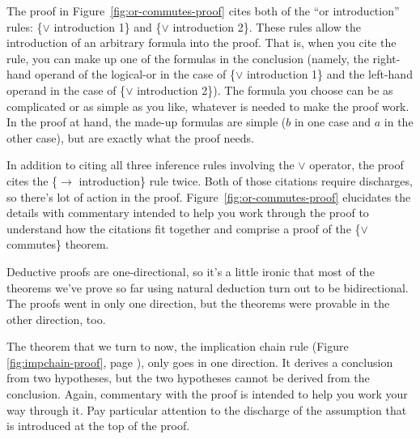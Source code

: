 {The proof in Figure~\ref{fig:or-commutes-proof} cites both of the
``or introduction'' rules:
\{$\vee$ introduction 1\} and \{$\vee$ introduction 2\}.
These rules allow the introduction of an arbitrary formula
into the proof.
That is, when you cite the rule, you can make up one of the
formulas in the conclusion (namely, the right-hand operand of
the logical-or in the case of \{$\vee$ introduction 1\}
and the left-hand operand in the case of \{$\vee$ introduction 2\}).
The formula you choose can be as complicated or as simple as you like,
whatever is needed to make the proof work.
In the proof at hand,
the made-up formulas are simple ($b$ in one case and $a$ in the other case),
but are exactly what the proof needs.

In addition to citing all three inference rules involving the $\vee$ operator,
the proof cites the \{$\rightarrow$ introduction\} rule twice.
Both of those citations require discharges,
so there's lot of action in the proof.
Figure~\ref{fig:or-commutes-proof}
elucidates the details with commentary
intended to help you work through the proof
to understand how the citations fit together and
comprise a proof of the \{$\vee$ commutes\} theorem.

Deductive proofs are one-directional,
so it's a little ironic that most
of the theorems we've prove so far using natural deduction
turn out to be bidirectional.
The proofs went in only one direction,
but the theorems were provable in the other direction, too.

The theorem that we turn to now, the implication chain rule
(Figure \ref{fig:impchain-proof}, page \pageref{fig:impchain-proof}),
only goes in one direction.
It derives a conclusion from two hypotheses,
but the two hypotheses cannot be derived from the conclusion.
Again, commentary with the proof is intended
to help you work your way through it.
Pay particular attention to the discharge of the
assumption that is introduced at the top of the proof.

}
